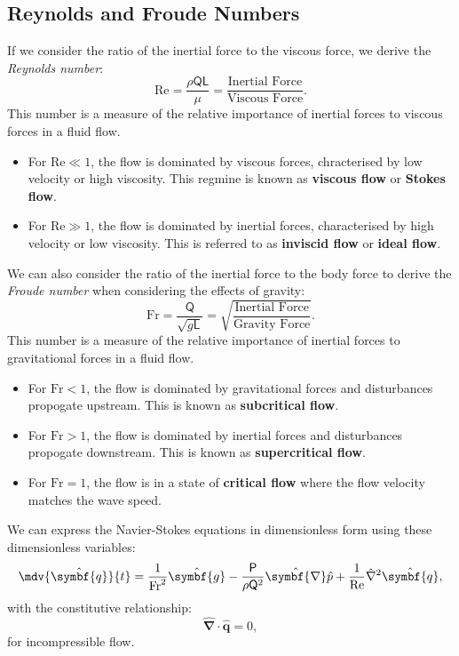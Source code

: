 \documentclass{article}
\theoremstyle{definition}
\begin{document}
\subsection{Reynolds and Froude Numbers}
If we consider the ratio of the inertial force to the viscous force, we
derive the \textit{Reynolds number}:
\begin{equation*}
    \mathrm{Re} = \frac{\rho \mathsf{Q} \mathsf{L}}{\mu} = \frac{\text{Inertial Force}}{\text{Viscous Force}}.
\end{equation*}
This number is a measure of the relative importance of inertial forces
to viscous forces in a fluid flow.
\begin{itemize}
    \item For \(\mathrm{Re} \ll 1\), the flow is dominated by viscous
          forces, chracterised by low velocity or high viscosity. This
          regmine is known as \textbf{viscous flow} or \textbf{Stokes
          flow}.
    \item For \(\mathrm{Re} \gg 1\), the flow is dominated by inertial
          forces, characterised by high velocity or low viscosity. This
          is referred to as \textbf{inviscid flow} or \textbf{ideal
          flow}.
\end{itemize}
We can also consider the ratio of the inertial force to the body force
to derive the \textit{Froude number} when considering the effects of
gravity:
\begin{equation*}
    \mathrm{Fr} = \frac{\mathsf{Q}}{\sqrt{g \mathsf{L}}} = \sqrt{\frac{\text{Inertial Force}}{\text{Gravity Force}}}.
\end{equation*}
This number is a measure of the relative importance of inertial forces
to gravitational forces in a fluid flow.
\begin{itemize}
    \item For \(\mathrm{Fr} < 1\), the flow is dominated by
          gravitational forces and disturbances propogate upstream.
          This is known as \textbf{subcritical flow}.
    \item For \(\mathrm{Fr} > 1\), the flow is dominated by inertial
          forces and disturbances propogate downstream. This is known
          as \textbf{supercritical flow}.
    \item For \(\mathrm{Fr} = 1\), the flow is in a state of
          \textbf{critical flow} where the flow velocity matches the
          wave speed.
\end{itemize}
We can express the Navier-Stokes equations in dimensionless form using
these dimensionless variables:
\begin{equation*}
    \mdv{\hat{\symbf{q}}}{t} = \frac{1}{\mathrm{Fr}^2} \hat{\symbf{g}} - \frac{\mathsf{P}}{\rho \mathsf{Q}^2} \hat{\symbf{\nabla}} \hat{p} + \frac{1}{\mathrm{Re}} \hat{\nabla}^2 \hat{\symbf{q}},
\end{equation*}
with the constitutive relationship:
\begin{equation*}
    \hat{\symbf{\nabla}} \cdot \hat{\symbf{q}} = 0,
\end{equation*}
for incompressible flow.
\end{document}
